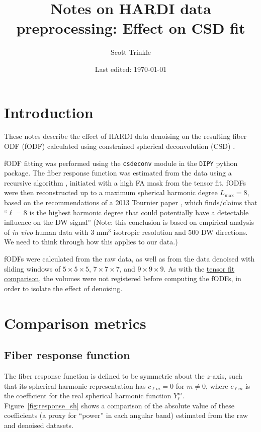 \documentclass{article}
\title{Notes on HARDI data preprocessing: Effect on CSD fit}
\author{Scott Trinkle}
\date{Last edited: \today}
\begin{document}
\maketitle

\section{Introduction}
These notes describe the effect of HARDI data denoising on the resulting fiber
ODF (fODF) calculated using constrained spherical deconvolution (CSD) \cite{Tournier2007}. 

fODF fitting was performed using the \texttt{csdeconv} module in the
\texttt{DIPY} python package. The fiber response function was estimated from the
data using a recursive algorithm \cite{Tax2014}, initiated with a high FA mask
from the tensor fit. fODFs were then reconstructed up to a maximum spherical
harmonic degree $L_{\text{max}} = 8$, based on the recommendations of a 2013
Tournier paper \cite{Tournier2013}, which finds/claims that ``$\ell=8$ is the
highest harmonic degree that could potentially have a detectable influence on
the DW signal'' (Note: this conclusion is based on empirical analysis of
\textit{in vivo} human data with 3 mm$^3$ isotropic resolution and 500 DW
directions. We need to think through how this applies to our data.)

fODFs were calculated from the raw data, as well
as from the data denoised with sliding windows of $5\times 5\times 5$,
$7\times 7\times 7$, and $9\times 9\times 9$. As with the
\href{https://github.com/scott-trinkle/hardi/blob/master/dti/compare_denoise_widths/report/tensorfit_notes.pdf}{tensor
  fit comparison}, the volumes were not registered before computing the fODFs,
in order to isolate the effect of denoising.

\section{Comparison metrics}

\subsection{Fiber response function}

The fiber response function is defined to be symmetric about the $z$-axis, such
that its spherical harmonic representation has $c_{\ell m} = 0$ for $m \neq 0$,
where $c_{\ell m}$ is the coefficient for the real spherical harmonic function
$Y_{\ell}^m$. Figure~\ref{fig:response_sh} shows a comparison of the absolute value
of these coefficients (a proxy for ``power'' in each angular band) estimated
from the raw and denoised datasets.
\end{document}
